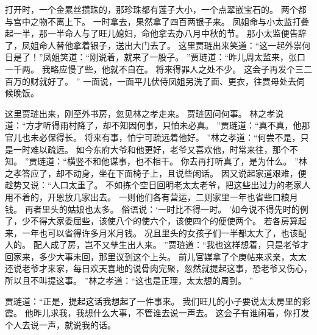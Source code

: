 打开时，一个金累丝攒珠的，那珍珠都有莲子大小，一个点翠嵌宝石的。
两个都与宫中之物不离上下。
一时拿去，果然拿了四百两银子来。
凤姐命与小太监打叠起一半，那一半命人与了旺儿媳妇，命他拿去办八月中秋的节。
那小太监便告辞了，凤姐命人替他拿着银子，送出大门去了。
这里贾琏出来笑道：“这一起外祟何日是了！”凤姐笑道：“刚说着，就来了一股子。
”贾琏道：“昨儿周太监来，张口一千两。
我略应慢了些，他就不自在。
将来得罪人之处不少。
这会子再发个三二百万的财就好了。
”
一面说，一面平儿伏侍凤姐另洗了面、更衣，往贾母处去伺候晚饭。
\par
这里贾琏出来，刚至外书房，忽见林之孝走来。
贾琏因问何事。
林之孝说道：“方才听得雨村降了，却不知因何事，只怕未必真。
”贾琏道：“真不真，他那官儿也未必保得长。
将来有事，怕宁可疏远着他好。
”林之孝道：“何尝不是，只是一时难以疏远。
如今东府大爷和他更好，老爷又喜欢他，时常来往，那个不知。
”贾琏道：“横竖不和他谋事，也不相干。
你去再打听真了，是为什么。
”林之孝答应了，却不动身，坐在下面椅子上，且说些闲话。
因又说起家道艰难，便趁势又说：“人口太重了。
不如拣个空日回明老太太老爷，把这些出过力的老家人用不着的，开恩放几家出去。
一则他们各有营运，二则家里一年也省些口粮月钱。
再者里头的姑娘也太多。
俗语说：‘一时比不得一时。
’如今说不得先时的例了，少不得大家委屈些，该使八个的使六个，该使四个的便使两个。
若各房算起来，一年也可以省得许多月米月钱。
况且里头的女孩子们一半都太大了，也该配人的。
配人成了房，岂不又孳生出人来。
”贾琏道：“我也这样想着，只是老爷才回家来，多少大事未回，那里议到这个上头。
前儿官媒拿了个庚帖来求亲，太太还说老爷才来家，每日欢天喜地的说骨肉完聚，忽然就提起这事，恐老爷又伤心，所以且不叫提这事。
”林之孝道：“这也是正理，太太想的周到。
”\par
贾琏道：“正是，提起这话我想起了一件事来。
我们旺儿的小子要说太太房里的彩霞。
他昨儿求我，我想什么大事，不管谁去说一声去。
这会子有谁闲着，你打发个人去说一声，就说我的话。
